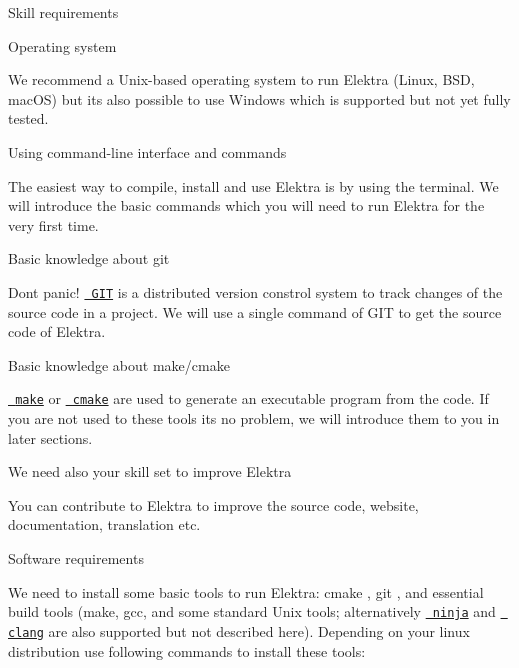 
\begin{DoxyItemize}
\item Skill requirements
\begin{DoxyItemize}
\item Operating system

We recommend a Unix-\/based operating system to run Elektra (Linux, B\+SD, mac\+OS) but it\textquotesingle{}s also possible to use Windows which is supported but not yet fully tested.
\item Using command-\/line interface and commands

The easiest way to compile, install and use Elektra is by using the terminal. We will introduce the basic commands which you will need to run Elektra for the very first time.
\item Basic knowledge about git

Dont panic! \href{https://git-scm.com/}{\texttt{ G\+IT}} is a distributed version constrol system to track changes of the source code in a project. We will use a single command of G\+IT to get the source code of Elektra.
\item Basic knowledge about make/cmake

\href{https://www.gnu.org/software/make/}{\texttt{ make}} or \href{https://cmake.org/}{\texttt{ cmake}} are used to generate an executable program from the code. If you are not used to these tools its no problem, we will introduce them to you in later sections.
\item We need also your skill set to improve Elektra

You can contribute to Elektra to improve the source code, website, documentation, translation etc.
\end{DoxyItemize}
\item Software requirements

We need to install some basic tools to run Elektra\+: cmake , git , and essential build tools (make, gcc, and some standard Unix tools; alternatively \href{https://ninja-build.org/}{\texttt{ ninja}} and \href{https://clang.llvm.org/index.html}{\texttt{ clang}} are also supported but not described here). Depending on your linux distribution use following commands to install these tools\+:
\end{DoxyItemize}


\begin{DoxyCode}{0}
\end{DoxyCode}


